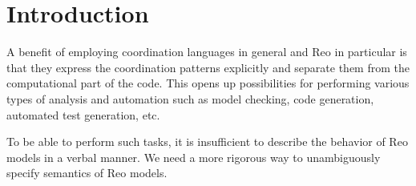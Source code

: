 \section{Introduction}
\label{ssec:formalsem}
A benefit of employing coordination languages in general and Reo in particular is that they express the coordination patterns explicitly and separate them from the computational part of the code. This opens up possibilities for performing various types of analysis and automation such as model checking, code generation, automated test generation, etc. 

To be able to perform such tasks, it is insufficient to describe the behavior of Reo models in a verbal manner. We need a more rigorous way to unambiguously specify semantics of Reo models.%

